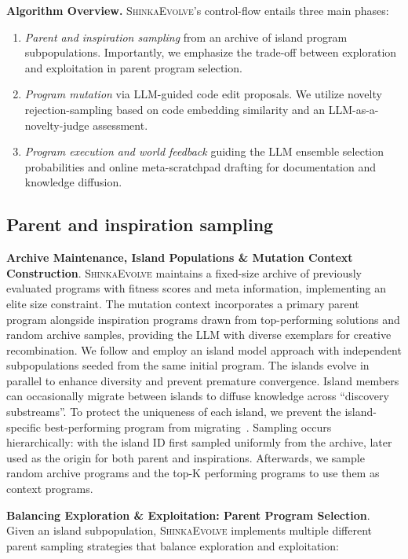 \documentclass[11pt, a4paper]{include/gdm_format}
\newcommand{\ouralgo}{\textsc{ShinkaEvolve}\xspace}
\begin{document}
\textbf{Algorithm Overview.} \ouralgo's control-flow entails three main phases: 
\begin{enumerate}
\item \textit{Parent and inspiration sampling} from an archive of island program subpopulations. Importantly, we emphasize the trade-off between exploration and exploitation in parent program selection.
\item \textit{Program mutation} via LLM-guided code edit proposals. We utilize novelty rejection-sampling based on code embedding similarity and an LLM-as-a-novelty-judge assessment.
\item \textit{Program execution and world feedback} guiding the LLM ensemble selection probabilities and online meta-scratchpad drafting for documentation and knowledge diffusion.
\end{enumerate}

\subsection{Parent and inspiration sampling}
\textbf{Archive Maintenance, Island Populations \& Mutation Context Construction}. \ouralgo maintains a fixed-size archive of previously evaluated programs with fitness scores and meta information, implementing an elite size constraint. The mutation context incorporates a primary parent program alongside inspiration programs drawn from top-performing solutions and random archive samples, providing the LLM with diverse exemplars for creative recombination. We follow \citet{romera2024mathematical,novikov2025alphaevolve} and employ an island model approach with independent subpopulations seeded from the same initial program. The islands evolve in parallel to enhance diversity and prevent premature convergence. Island members can occasionally migrate between islands to diffuse knowledge across ``discovery substreams''. To protect the uniqueness of each island, we prevent the island-specific best-performing program from migrating~\citep{tanese1989distributed, romera2024mathematical}. Sampling occurs hierarchically: with the island ID first sampled uniformly from the archive, later used as the origin for both parent and inspirations. Afterwards, we sample random archive programs and the top-K performing programs to use them as context programs.

\textbf{Balancing Exploration \& Exploitation: Parent Program Selection}. Given an island subpopulation, \ouralgo implements multiple different parent sampling strategies that balance exploration and exploitation: 
\end{document}
